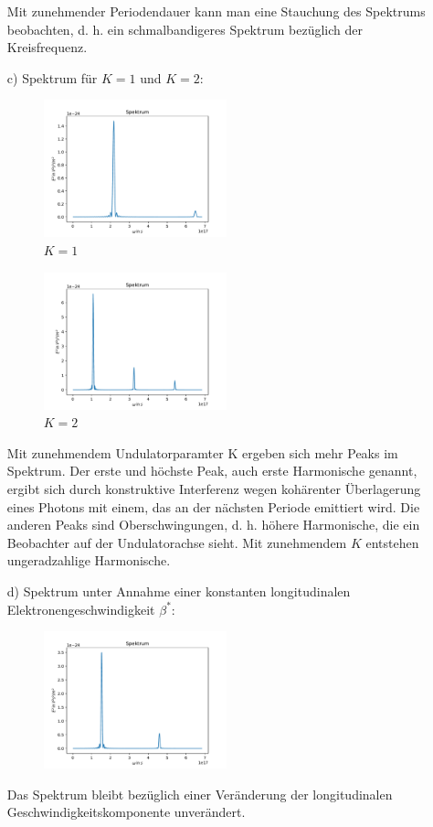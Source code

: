 \documentclass[11pt,a4paper]{article}
\begin{document}
\begin{itemize}
			Mit zunehmender Periodendauer kann man eine Stauchung des Spektrums beobachten, d. h. ein schmalbandigeres Spektrum 
			bezüglich der Kreisfrequenz.

			\item[c)] Spektrum für $K = 1$ und $K = 2$:
			\begin{figure}[H]
				\centering
				\includegraphics[width=0.5\textwidth]{build/spektrum_K1_Perioden20.pdf}
				\caption{$K=1$}
			\end{figure}

			\begin{figure}[H]
				\centering
				\includegraphics[width=0.5\textwidth]{build/spektrum_K2_Perioden20.pdf}
				\caption{$K=2$}
			\end{figure}

			Mit zunehmendem Undulatorparamter K ergeben sich mehr Peaks im Spektrum. Der erste und höchste Peak, auch erste Harmonische genannt, ergibt sich durch konstruktive Interferenz 
			wegen kohärenter Überlagerung eines Photons mit einem, das an der nächsten Periode emittiert wird. Die anderen Peaks sind Oberschwingungen, d. h. höhere Harmonische, die ein
			Beobachter auf der Undulatorachse sieht. Mit zunehmendem $K$ entstehen ungeradzahlige Harmonische.
		

			\item[d)] Spektrum unter Annahme einer konstanten longitudinalen Elektronengeschwindigkeit $\beta^{*}$:

			\begin{figure}[H]
				\centering
				\includegraphics[width=0.5\textwidth]{build/spektrum_K1.5_Perioden20_d.pdf}
			\end{figure}

			Das Spektrum bleibt bezüglich einer Veränderung der longitudinalen Geschwindigkeitskomponente unverändert.

		\end{itemize}
\end{document}
